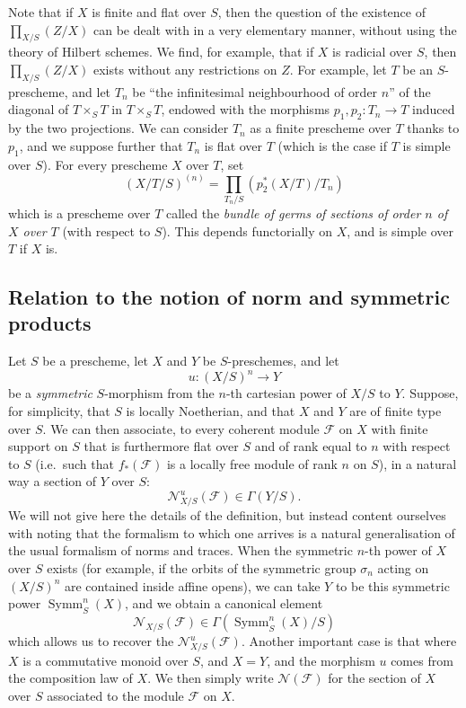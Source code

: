 \documentclass{article}
\newcommand{\oldpage}[1]{\marginpar{\footnotesize$\Big\vert$ \textit{p.~#1}}}
\theoremstyle{definition}
\theoremstyle{definition}
\theoremstyle{definition}
\theoremstyle{definition}
\theoremstyle{remark}
\begin{document}
Note that if \(X\) is finite and flat over \(S\), then the question of the existence of \(\prod_{X/S}(Z/X)\) can be dealt with in a very elementary manner, without using the theory of Hilbert schemes.
\oldpage{221-25}We find, for example, that if \(X\) is radicial over \(S\), then \(\prod_{X/S}(Z/X)\) exists without any restrictions on \(Z\).
For example, let \(T\) be an \(S\)-prescheme, and let \(T_n\) be ``the infinitesimal neighbourhood of order \(n\)'' of the diagonal of \(T\times_S T\) in \(T\times_S T\), endowed with the morphisms \(p_1,p_2\colon T_n\to T\) induced by the two projections.
We can consider \(T_n\) as a finite prescheme over \(T\) thanks to \(p_1\), and we suppose further that \(T_n\) is flat over \(T\) (which is the case if \(T\) is simple over \(S\)).
For every prescheme \(X\) over \(T\), set
\[
  (X/T/S)^{(n)} = \prod_{T_n/S}(p_2^*(X/T)/T_n)
\]
which is a prescheme over \(T\) called the \emph{bundle of germs of sections of order \(n\) of \(X\) over \(T\)} (with respect to \(S\)).
This depends functorially on \(X\), and is simple over \(T\) if \(X\) is.

\hypertarget{fga-3-iv-section-6}{%
\subsection{Relation to the notion of norm and symmetric products}\label{fga-3-iv-section-6}}

Let \(S\) be a prescheme, let \(X\) and \(Y\) be \(S\)-preschemes, and let
\[
  u\colon(X/S)^n\to Y
\]
be a \emph{symmetric} \(S\)-morphism from the \(n\)-th cartesian power of \(X/S\) to \(Y\).
Suppose, for simplicity, that \(S\) is locally Noetherian, and that \(X\) and \(Y\) are of finite type over \(S\).
We can then associate, to every coherent module \({\mathscr{F}}\) on \(X\) with finite support on \(S\) that is furthermore flat over \(S\) and of rank equal to \(n\) with respect to \(S\) (i.e.~such that \(f_*({\mathscr{F}})\) is a locally free module of rank \(n\) on \(S\)), in a natural way a section of \(Y\) over \(S\):
\[
  {\mathscr{N}}_{X/S}^u({\mathscr{F}}) \in \Gamma(Y/S).
\]
We will not give here the details of the definition, but instead content ourselves with noting that the formalism to which one arrives is a natural generalisation of the usual formalism of norms and traces.
When the symmetric \(n\)-th power of \(X\) over \(S\) exists (for example, if the orbits of the symmetric group \(\sigma_n\) acting on \((X/S)^n\) are contained inside affine opens), we can take \(Y\) to be this symmetric power \(\operatorname{Symm}_S^n(X)\), and we obtain a canonical element
\[
  {\mathscr{N}}_{X/S}({\mathscr{F}}) \in \Gamma(\operatorname{Symm}_S^n(X)/S)
\]
\oldpage{221-26}which allows us to recover the \({\mathscr{N}}_{X/S}^u({\mathscr{F}})\).
Another important case is that where \(X\) is a commutative monoid over \(S\), and \(X=Y\), and the morphism \(u\) comes from the composition law of \(X\).
We then simply write \({\mathscr{N}}({\mathscr{F}})\) for the section of \(X\) over \(S\) associated to the module \({\mathscr{F}}\) on \(X\).
\end{document}
